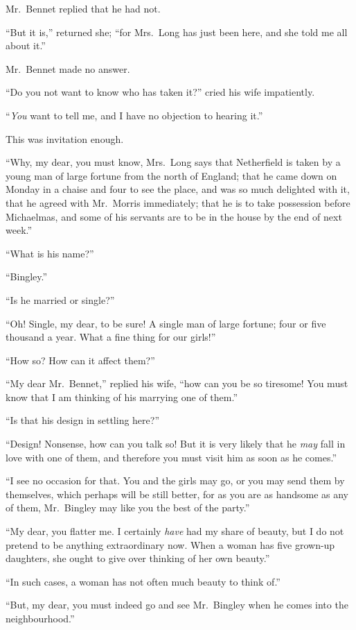 Mr.\ Bennet replied that he had not.

``But it is,'' returned she; ``for Mrs.\ Long has just been here, and
she told me all about it.''

Mr.\ Bennet made no answer.

``Do you not want to know who has taken it?'' cried his wife
impatiently.

``\emph{You} want to tell me, and I have no objection to hearing it.''

This was invitation enough.

``Why, my dear, you must know, Mrs.\ Long says that Netherfield
is taken by a young man of large fortune from the north of
England; that he came down on Monday in a chaise and four to
see the place, and was so much delighted with it, that he agreed
with Mr.\ Morris immediately; that he is to take possession
before Michaelmas, and some of his servants are to be in the
house by the end of next week.''

``What is his name?''

``Bingley.''

``Is he married or single?''

``Oh!  Single, my dear, to be sure!  A single man of large
fortune; four or five thousand a year.  What a fine thing for our
girls!''

``How so?  How can it affect them?''

``My dear Mr.\ Bennet,'' replied his wife, ``how can you be so
tiresome!  You must know that I am thinking of his marrying
one of them.''

``Is that his design in settling here?''

``Design!  Nonsense, how can you talk so!  But it is very likely
that he \emph{may} fall in love with one of them, and therefore you
must visit him as soon as he comes.''

``I see no occasion for that.  You and the girls may go, or you
may send them by themselves, which perhaps will be still
better, for as you are as handsome as any of them, Mr.\ Bingley
may like you the best of the party.''

``My dear, you flatter me.  I certainly \emph{have} had my share of
beauty, but I do not pretend to be anything extraordinary now.
When a woman has five grown-up daughters, she ought to give
over thinking of her own beauty.''

``In such cases, a woman has not often much beauty to think of.''

``But, my dear, you must indeed go and see Mr.\ Bingley when
he comes into the neighbourhood.''

